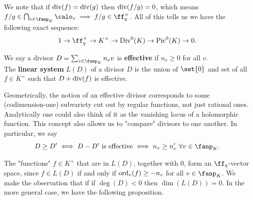 \documentclass[11pt, x11names, openany]{book}
\begin{document}
We note that if $\operatorname{div}(f) = \operatorname{div}(g)$ then $\operatorname{div}(f/g) = 0$, which means $f/g \in \bigcap_{v \in \fanp_K} \calo_v \implies f/g \in \ff_q^\times$. All of this tells us we have the following exact sequence:
\begin{equation*}
    1 \to \ff_q^\times \to K^\times \to \Div^0(K) \to \pic^0(K) \to 0.
\end{equation*}


\begin{defn}
    \label{def: linear system}
We say a divisor $D = \sum_{v \in \fanp_K} n_v v$ is \textbf{effective} if $n_v \geq 0$ for all $v$.\\
The \textbf{linear system} $L(D)$ of a divisor $D$ is the union of $\set{0}$ and set of all $f \in K^\times$ such that $D + \operatorname{div}(f)$ is effective.
\end{defn}
Geometrically, the notion of an effective divisor corresponds to some (codimension-one) subvariety cut out by regular functions, not just rational ones. Analytically one could also think of it as the vanishing locus of a holomorphic function. This concept also allows us to "compare" divisors to one another. In particular, we say
\begin{equation*}
    D \geq D' \iff D - D' \text{ is effective} \iff n_v \geq n'_v \ \forall v \in \fanp_K.
\end{equation*}

\begin{observation}
The "functions" $f \in K^\times$ that are in $L(D)$, together with 0, form an $\ff_q$-vector space, since $f \in L(D)$ if and only if $\operatorname{ord}_v(f) \geq -n_v$ for all $v \in \fanp_K$.  We make the observation that if if $\deg(D) < 0$ then $\dim(L(D)) = 0$. In the more general case, we have the following proposition.
\end{observation}
\end{document}
